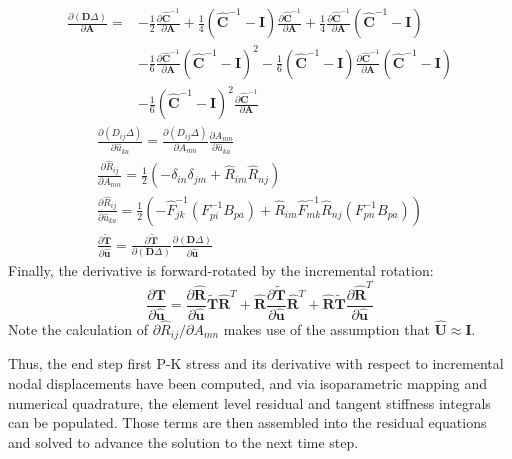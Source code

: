 \begin{equation}
\begin{aligned}
\frac{\partial ({\bm D}\Delta)}{\partial {\bm A}} = &-\frac{1}{2}\frac{\partial {\hat{\bm C}^{-1}}}{\partial \bm A} + \frac{1}{4}({\hat{\bm C}}^{-1} - {\bm I})\frac{\partial \hat{\bm C}^{-1}}{\partial {\bm A}} + \frac{1}{4}\frac{\partial \hat{\bm C}^{-1}}{\partial {\bm A}}({\hat{\bm C}}^{-1} - {\bm I}) \\
&-\frac{1}{6} \frac{\partial {\hat{\bm C}^{-1}}}{\partial \bm A} (\hat{\bm C}^{-1} - {\bm I})^{2} - \frac{1}{6}  (\hat{\bm C}^{-1} - {\bm I}) \frac{\partial {\hat{\bm C}^{-1}}}{\partial \bm A} (\hat{\bm C}^{-1} - {\bm I}) \\
&- \frac{1}{6}(\hat{\bm C}^{-1} - {\bm I})^{2} \frac{\partial {\hat{\bm C}^{-1}}}{\partial \bm A} 
\end{aligned}
\end{equation}
\begin{gather}
\frac{\partial (D_{ij}\Delta)}{\partial \hat{u}_{ka}} = \frac{\partial (D_{ij}\Delta)}{\partial A_{mn}}\frac{\partial A_{mn}}{\partial \hat{u}_{ka}} \\
\frac{\partial \hat{R}_{ij}}{\partial A_{mn}} = \frac{1}{2}(-\delta_{in}\delta_{jm} + \hat{R}_{im}\hat{R}_{nj}) \\
\frac{\partial \hat{R}_{ij}}{\partial \hat{u}_{ka}} = \frac{1}{2}\left(-\hat{F}_{jk}^{-1}(F_{pi}^{-1}B_{pa}) + \hat{R}_{im}\hat{F}_{mk}^{-1}\hat{R}_{nj}(F_{pn}^{-1}B_{pa})\right) \\
\frac{\partial \tilde{\bm T}}{\partial \hat{\bm u}} = \frac{\partial \tilde{\bm T}}{\partial ({\bm D}\Delta)}\frac{\partial ({\bm D}\Delta)}{\partial \hat{\bm u}}
\end{gather}
Finally, the derivative is forward-rotated by the incremental rotation:
\begin{equation}
\frac{\partial {\bm T}}{\partial \hat{\bm u}} = \frac{\partial \hat{\bm R}}{\partial \hat{\bm u}}{\tilde {\bm T}}{\hat{\bm R}}^{T} + {\hat{\bm R}}\frac{\partial \tilde{\bm T}}{\partial \hat{\bm u}}\hat{\bm R}^T + \hat{\bm R}\tilde{\bm T}\frac{\partial \hat{\bm R}^{T}}{\partial \hat{\bm u}}
\end{equation}
Note the calculation of ${\partial \hat{R}_{ij}}/{\partial A_{mn}}$ makes use of the assumption that $\hat{\bm{U}} \approx \bm{I}$.

Thus, the end step first P-K stress and its derivative with respect to incremental nodal displacements have been computed, and via isoparametric mapping and numerical quadrature, the element level residual and tangent stiffness integrals can be populated. Those terms are then assembled into the residual equations and solved to advance the solution to the next time step.

